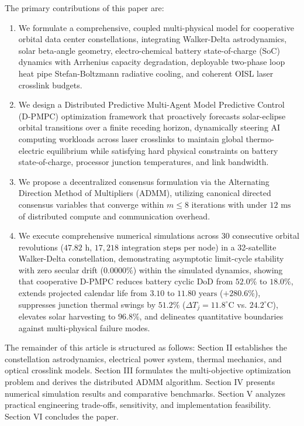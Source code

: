 \documentclass[journal]{IEEEtran}
\begin{document}
The primary contributions of this paper are:
\begin{enumerate}
    \item We formulate a comprehensive, coupled multi-physical model for cooperative orbital data center constellations, integrating Walker-Delta astrodynamics, solar beta-angle geometry, electro-chemical battery state-of-charge (SoC) dynamics with Arrhenius capacity degradation, deployable two-phase loop heat pipe Stefan-Boltzmann radiative cooling, and coherent OISL laser crosslink budgets.
    \item We design a Distributed Predictive Multi-Agent Model Predictive Control (D-PMPC) optimization framework that proactively forecasts solar-eclipse orbital transitions over a finite receding horizon, dynamically steering AI computing workloads across laser crosslinks to maintain global thermo-electric equilibrium while satisfying hard physical constraints on battery state-of-charge, processor junction temperatures, and link bandwidth.
    \item We propose a decentralized consensus formulation via the Alternating Direction Method of Multipliers (ADMM), utilizing canonical directed consensus variables that converge within $m \le 8$ iterations with under $12\text{ ms}$ of distributed compute and communication overhead.
    \item We execute comprehensive numerical simulations across 30 consecutive orbital revolutions ($47.82\text{ h}$, $17,218\text{ integration steps}$ per node) in a 32-satellite Walker-Delta constellation, demonstrating asymptotic limit-cycle stability with zero secular drift ($0.0000\%$) within the simulated dynamics, showing that cooperative D-PMPC reduces battery cyclic DoD from $52.0\%$ to $18.0\%$, extends projected calendar life from $3.10$ to $11.80\text{ years}$ ($+280.6\%$), suppresses junction thermal swings by $51.2\%$ ($\Delta T_j = 11.8^\circ\text{C}$ vs. $24.2^\circ\text{C}$), elevates solar harvesting to $96.8\%$, and delineates quantitative boundaries against multi-physical failure modes.
\end{enumerate}

The remainder of this article is structured as follows: Section II establishes the constellation astrodynamics, electrical power system, thermal mechanics, and optical crosslink models. Section III formulates the multi-objective optimization problem and derives the distributed ADMM algorithm. Section IV presents numerical simulation results and comparative benchmarks. Section V analyzes practical engineering trade-offs, sensitivity, and implementation feasibility. Section VI concludes the paper.
\end{document}
